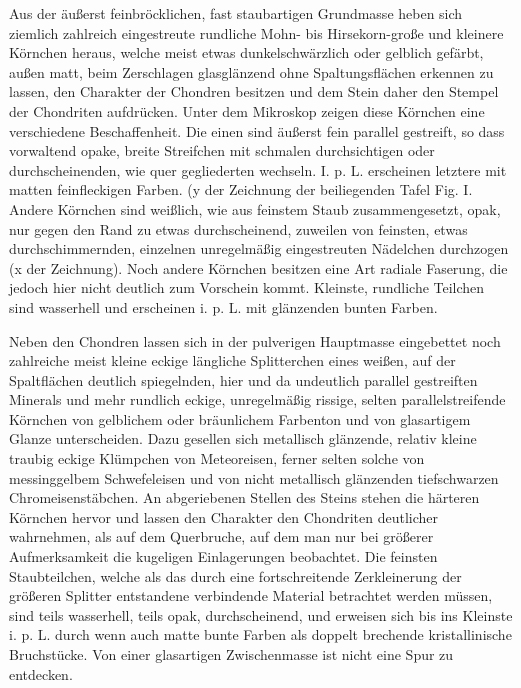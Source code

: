 \documentclass[a4paper, 11pt, oneside]{article}
\begin{document}
Aus der äußerst feinbröcklichen, fast staubartigen Grundmasse heben sich ziemlich zahlreich eingestreute rundliche Mohn- bis Hirsekorn-große und kleinere Körnchen heraus, welche meist etwas dunkelschwärzlich oder gelblich gefärbt, außen matt, beim Zerschlagen glasglänzend ohne Spaltungsflächen erkennen zu lassen, den Charakter der Chondren besitzen und dem Stein daher den Stempel der Chondriten aufdrücken. Unter dem Mikroskop zeigen diese Körnchen eine verschiedene Beschaffenheit. Die einen sind äußerst fein parallel gestreift, so dass vorwaltend opake, breite Streifchen mit schmalen durchsichtigen oder durchscheinenden, wie quer gegliederten wechseln. I. p. L. erscheinen letztere mit matten feinfleckigen Farben. (y der Zeichnung der beiliegenden Tafel Fig. I. Andere Körnchen sind weißlich, wie aus feinstem Staub zusammengesetzt, opak, nur gegen den Rand zu etwas durchscheinend, zuweilen von feinsten, etwas durchschimmernden, einzelnen unregelmäßig eingestreuten Nädelchen durchzogen (x der Zeichnung). Noch andere Körnchen besitzen eine Art radiale Faserung, die jedoch hier nicht deutlich zum Vorschein kommt. Kleinste, rundliche Teilchen sind wasserhell und erscheinen i. p. L. mit glänzenden bunten Farben.

Neben den Chondren lassen sich in der pulverigen Hauptmasse eingebettet noch zahlreiche meist kleine eckige längliche Splitterchen eines weißen, auf der Spaltflächen deutlich spiegelnden, hier und da undeutlich parallel gestreiften Minerals und mehr rundlich eckige, unregelmäßig rissige, selten parallelstreifende Körnchen von gelblichem oder bräunlichem Farbenton und von glasartigem Glanze unterscheiden. Dazu gesellen sich metallisch glänzende, relativ kleine traubig eckige Klümpchen von Meteoreisen, ferner selten solche von messinggelbem Schwefeleisen und von nicht metallisch glänzenden tiefschwarzen Chromeisenstäbchen. An abgeriebenen Stellen des Steins stehen die härteren Körnchen hervor und lassen den Charakter den Chondriten deutlicher wahrnehmen, als auf dem Querbruche, auf dem man nur bei größerer Aufmerksamkeit die kugeligen Einlagerungen beobachtet. Die feinsten Staubteilchen, welche als das durch eine fortschreitende Zerkleinerung der größeren Splitter entstandene verbindende Material betrachtet werden müssen, sind teils wasserhell, teils opak, durchscheinend, und erweisen sich bis ins Kleinste i. p. L. durch wenn auch matte bunte Farben als doppelt brechende kristallinische Bruchstücke. Von einer glasartigen Zwischenmasse ist nicht eine Spur zu entdecken.
\end{document}
